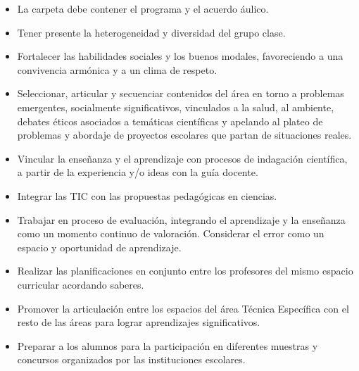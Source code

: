 \documentclass[a4paper]{article}
\begin{document}
\begin{itemize}
    \item La carpeta debe contener el programa y el acuerdo áulico. 

    \item Tener presente la heterogeneidad y diversidad del grupo clase. 

    \item Fortalecer las habilidades sociales y los buenos modales, favoreciendo a una convivencia armónica y a un clima de respeto. 

    \item Seleccionar, articular y secuenciar contenidos del área en torno a problemas emergentes, socialmente significativos, vinculados a la salud, al ambiente, debates éticos asociados a temáticas científicas y apelando al plateo de problemas y abordaje de proyectos escolares que partan de situaciones reales. 

    \item Vincular la enseñanza y el aprendizaje con procesos de indagación científica, a partir de la experiencia y/o ideas con la guía docente. 

    \item Integrar las TIC con las propuestas pedagógicas en ciencias. 

    \item Trabajar en proceso de evaluación, integrando el aprendizaje y la enseñanza como un momento continuo de valoración. Considerar el error como un espacio y oportunidad de aprendizaje. 

    \item Realizar las planificaciones en conjunto entre los profesores del mismo espacio curricular acordando saberes. 

    \item Promover la articulación entre los espacios del área Técnica Específica con el resto de las áreas para lograr aprendizajes significativos.  

    \item Preparar a los alumnos para la participación en diferentes muestras y concursos organizados por las instituciones escolares. 


\end{itemize}
\end{document}
